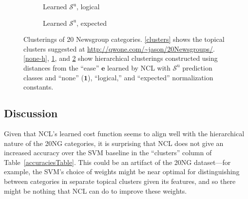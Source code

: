 \documentclass{article} %
\newcommand{\unorderedS}{\mathcal{S}^{\mathrm{u}}}
\newcommand{\ourmethod}{NCL}
\begin{document}
\begin{figure}
\begin{subfigure}{.5\textwidth}
\begin{tikzpicture}
\end{tikzpicture}
\caption{Learned $\unorderedS$, logical}
\label{logical-h}
\end{subfigure}%
\begin{subfigure}{.5\textwidth}
\centering
{}
\caption{Learned $\unorderedS$, expected}
\label{expected-h}
\end{subfigure}
\caption{Clusterings of 20 Newsgroup categories.  \ref{clusters} shows
the topical clusters suggested at \url{http://qwone.com/~jason/20Newsgroups/}.
\ref{none-h}, \ref{logical-h}, and \ref{expected-h} show hierarchical
clusterings constructed using distances from the ``ease'' $\mathbf{e}$ 
learned by \ourmethod{} with $\unorderedS$ prediction classes and
``none'' ($\mathbf{1}$), ``logical,'' and ``expected'' normalization
constants.
\label{hierarchies}}
\end{figure}

\subsection{Discussion}

Given that \ourmethod{}'s learned cost function seems to align well
with the hierarchical nature of the 20NG categories,
it is surprising that \ourmethod{} does not give an increased 
accuracy over the SVM baseline in the ``clusters'' column of
 Table~\ref{accuraciesTable}.
This could be an artifact of the 20NG dataset---for example,
the SVM's choice of weights might be near optimal for 
distinguishing between categories in separate topical clusters
given its features, and so there might be nothing that \ourmethod{}
can do to improve these weights. 
\end{document}

